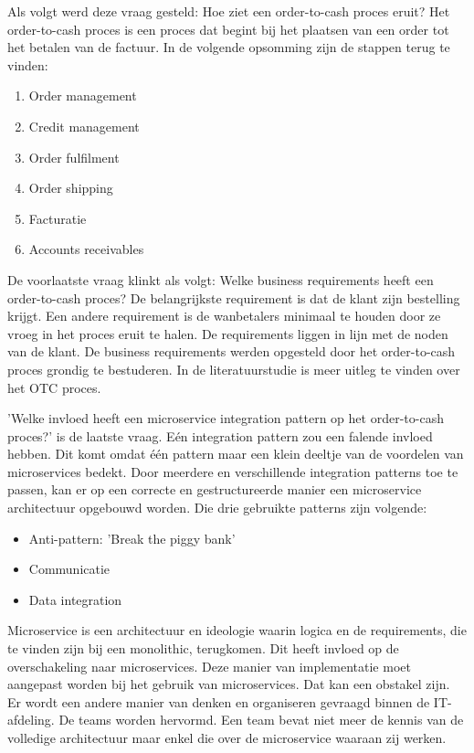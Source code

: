 Als volgt werd deze vraag gesteld: Hoe ziet een order-to-cash proces eruit? 
Het order-to-cash proces is een proces dat begint bij het plaatsen van een order tot het betalen van de factuur. In de volgende opsomming zijn de stappen terug te vinden:
\begin{enumerate}
	\item Order management
	\item Credit management
	\item Order fulfilment
	\item Order shipping
	\item Facturatie
	\item Accounts receivables
\end{enumerate}

De voorlaatste vraag klinkt als volgt: Welke business requirements heeft een order-to-cash proces?
De belangrijkste requirement is dat de klant zijn bestelling krijgt. Een andere requirement is de wanbetalers minimaal te houden door ze vroeg in het proces eruit te halen. De requirements liggen in lijn met de noden van de klant. De business requirements werden opgesteld door het order-to-cash proces grondig te bestuderen. In de literatuurstudie is meer uitleg te vinden over het OTC proces.

'Welke invloed heeft een microservice integration pattern op het order-to-cash proces?' is de laatste vraag. Eén integration pattern zou een falende invloed hebben. Dit komt omdat één pattern maar een klein deeltje van de voordelen van microservices bedekt. Door meerdere en verschillende integration patterns toe te passen, kan er op een correcte en gestructureerde manier een microservice architectuur opgebouwd worden. Die drie gebruikte patterns zijn volgende:
\begin{itemize}
	\item Anti-pattern: 'Break the piggy bank'
	\item Communicatie
	\item Data integration
\end{itemize}


Microservice is een architectuur en ideologie waarin logica en de requirements, die te vinden zijn bij een monolithic, terugkomen. Dit heeft invloed op de overschakeling naar microservices. Deze manier van implementatie moet aangepast worden bij het gebruik van microservices. Dat kan een obstakel zijn. Er wordt een andere manier van denken en organiseren gevraagd binnen de IT-afdeling. De teams worden hervormd. Een team bevat niet meer de kennis van de volledige architectuur maar enkel die over de microservice waaraan zij werken. 


